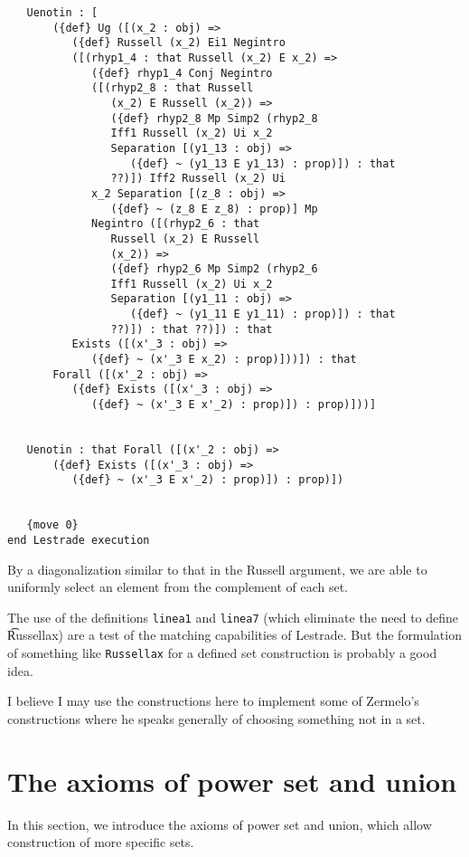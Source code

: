 \documentclass[12pt]{article}
\begin{document}
\begin{verbatim}
   Uenotin : [
       ({def} Ug ([(x_2 : obj) => 
          ({def} Russell (x_2) Ei1 Negintro 
          ([(rhyp1_4 : that Russell (x_2) E x_2) => 
             ({def} rhyp1_4 Conj Negintro 
             ([(rhyp2_8 : that Russell 
                (x_2) E Russell (x_2)) => 
                ({def} rhyp2_8 Mp Simp2 (rhyp2_8 
                Iff1 Russell (x_2) Ui x_2 
                Separation [(y1_13 : obj) => 
                   ({def} ~ (y1_13 E y1_13) : prop)]) : that 
                ??)]) Iff2 Russell (x_2) Ui 
             x_2 Separation [(z_8 : obj) => 
                ({def} ~ (z_8 E z_8) : prop)] Mp 
             Negintro ([(rhyp2_6 : that 
                Russell (x_2) E Russell 
                (x_2)) => 
                ({def} rhyp2_6 Mp Simp2 (rhyp2_6 
                Iff1 Russell (x_2) Ui x_2 
                Separation [(y1_11 : obj) => 
                   ({def} ~ (y1_11 E y1_11) : prop)]) : that 
                ??)]) : that ??)]) : that 
          Exists ([(x'_3 : obj) => 
             ({def} ~ (x'_3 E x_2) : prop)]))]) : that 
       Forall ([(x'_2 : obj) => 
          ({def} Exists ([(x'_3 : obj) => 
             ({def} ~ (x'_3 E x'_2) : prop)]) : prop)]))]


   Uenotin : that Forall ([(x'_2 : obj) => 
       ({def} Exists ([(x'_3 : obj) => 
          ({def} ~ (x'_3 E x'_2) : prop)]) : prop)])


   {move 0}
end Lestrade execution
\end{verbatim}

By a diagonalization similar to that in the Russell argument, we are able to uniformly select an element from the complement of each set.

The use of the definitions {\tt linea1} and {\tt linea7} (which eliminate the need to define {\t Russellax}) are a test of the matching capabilities of Lestrade.  But the formulation of something like {\tt Russellax} for a defined set construction is probably a good idea.

I believe I may use the constructions here to implement some of Zermelo's constructions where he speaks generally of choosing something not in a set.

\section{The axioms of power set and union}

In this section, we introduce the axioms of power set and union, which allow construction of more specific sets.
\end{document}
